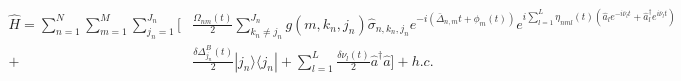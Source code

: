 \documentclass[10pt]{article}
\begin{document}
\begin{align*}\hat{H} = \sum_{n=1}^N \sum_{m=1}^M \sum_{j_n=1}^{J_n}
\bigg[&\frac{\Omega_{nm}(t)}{2} \sum_{k_n \ne j_n}^{J_n} g(m, k_n, j_n) \hat{\sigma}_{n,k_n,j_n}e^{-i(\bar{\Delta}_{n,m}t+\phi_m(t))} e^{i\sum_{l=1}^L \eta_{nml}(t)(\hat{a}_l e^{-i\bar{\nu}_l t} + \hat{a}^{\dagger}_l e^{i\bar{\nu}_l t})} \\
+& \frac{\delta\Delta_{j_n}^B(t)}{2} |j_n\rangle\langle j_n | + \sum_{l=1}^L \frac{\delta\nu_l(t)}{2} \hat{a}^{\dagger}\hat{a}
\bigg] + h.c.
\end{align*}
\end{document}
